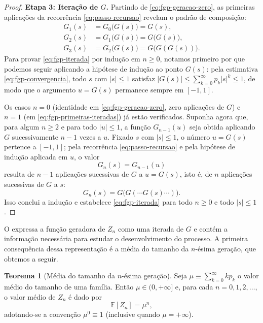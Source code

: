 \documentclass[12pt,portuguese]{article}
\theoremstyle{definition}
\newtheorem{theorem}{Teorema}
\theoremstyle{plainexercise}
\theoremstyle{starredexercise}
\theoremstyle{definition}
\begin{document}
\begin{proof}
\medskip
\noindent\textbf{Etapa 3: Iteração de $G$.}
Partindo de \eqref{eq:fgp-geracao-zero}, as primeiras aplicações da
recorrência \eqref{eq:passo-recursao} revelam o padrão de composição:
\begin{equation}\label{eq:fgp-primeiras-iteradas}
\begin{aligned}
G_1(s)&=G_0\bigl(G(s)\bigr)=G(s),\\
G_2(s)&=G_1\bigl(G(s)\bigr)=G\bigl(G(s)\bigr),\\
G_3(s)&=G_2\bigl(G(s)\bigr)=G\bigl(G(G(s))\bigr).
\end{aligned}
\end{equation}
Para provar \eqref{eq:fgp-iterada} por indução em $n\geqslant 0$,
notamos primeiro por que podemos seguir aplicando a hipótese de indução
ao ponto $G(s)$: pela estimativa \eqref{eq:fgp-convergencia}, todo $s$
com $|s|\leqslant 1$ satisfaz
$|G(s)|\leqslant\sum_{k=0}^{\infty}p_k|s|^k\leqslant 1$, de modo que o
argumento $u=G(s)$ permanece sempre em $[-1,1]$.

Os casos $n=0$ (identidade em \eqref{eq:fgp-geracao-zero}, zero
aplicações de $G$) e $n=1$ (em \eqref{eq:fgp-primeiras-iteradas}) já
estão verificados. Suponha agora que, para algum $n\geqslant 2$ e para
todo $|u|\leqslant 1$, a função $G_{n-1}(u)$ seja obtida aplicando $G$
sucessivamente $n-1$ vezes a $u$. Fixado $s$ com $|s|\leqslant 1$, o
número $u=G(s)$ pertence a $[-1,1]$; pela recorrência
\eqref{eq:passo-recursao} e pela hipótese de indução aplicada em $u$, o
valor
\[
G_n(s)=G_{n-1}(u)
\]
resulta de $n-1$ aplicações sucessivas de $G$ a $u=G(s)$, isto é, de $n$
aplicações sucessivas de $G$ a $s$:
\[
G_n(s)=G\bigl(G(\cdots G(s)\cdots)\bigr).
\]
Isso conclui a indução e estabelece \eqref{eq:fgp-iterada} para todo
$n\geqslant 0$ e todo $|s|\leqslant 1$.
\end{proof}

O  expressa a função geradora de $Z_n$ como
uma iterada de $G$ e contém a informação necessária para estudar
o desenvolvimento do processo. A primeira consequência dessa representação
é a média do tamanho da $n$-ésima geração, que obtemos a seguir.

\begin{theorem}[Média do tamanho da $n$-ésima geração]\label{thm:media-geracao}
Seja $\mu \equiv \sum_{k=0}^{\infty} k p_k$ o valor médio do tamanho de uma
família. Então $\mu\in (0,+\infty]$ e, para cada $n=0,1,2,\ldots$, o
valor médio de $Z_n$ é dado por
\begin{equation}\label{eq:media-mu-n}
\mathbb{E}[Z_n] = \mu^n,
\end{equation}
adotando-se a convenção $\mu^0 \equiv 1$ (inclusive quando $\mu=+\infty$).
\end{theorem}
\end{document}
